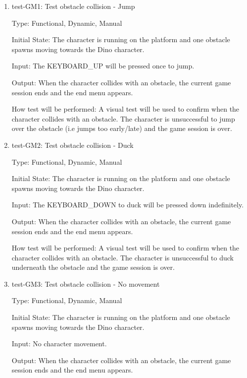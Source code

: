 \documentclass[12pt, titlepage]{article}
\begin{document}
\begin{enumerate}

\item{test-GM1: Test obstacle collision - Jump\\}

Type: Functional, Dynamic, Manual
					
Initial State: The character is running on the platform and one obstacle spawns moving towards the Dino character.
					
Input: The KEYBOARD\_UP will be pressed once to jump.
					
Output: When the character collides with an obstacle, the current game session ends and the end menu appears.
					
How test will be performed: A visual test will be used to confirm when the character collides with an obstacle. The character is unsuccessful to jump over the obstacle (i.e jumps too early/late) and the game session is over.

\item{test-GM2: Test obstacle collision - Duck\\}

Type: Functional, Dynamic, Manual
					
Initial State: The character is running on the platform and one obstacle spawns moving towards the Dino character.
					
Input: The  KEYBOARD\_DOWN to duck will be pressed down indefinitely.
					
Output: When the character collides with an obstacle, the current game session ends and the end menu appears.
					
How test will be performed: A visual test will be used to confirm when the character collides with an obstacle. The character is unsuccessful to duck underneath the obstacle and the game session is over.

\item{test-GM3: Test obstacle collision - No movement\\}

Type: Functional, Dynamic, Manual
					
Initial State: The character is running on the platform and one obstacle spawns moving towards the Dino character.
					
Input: No character movement.
					
Output: When the character collides with an obstacle, the current game session ends and the end menu appears.
					

\end{enumerate}
\end{document}
